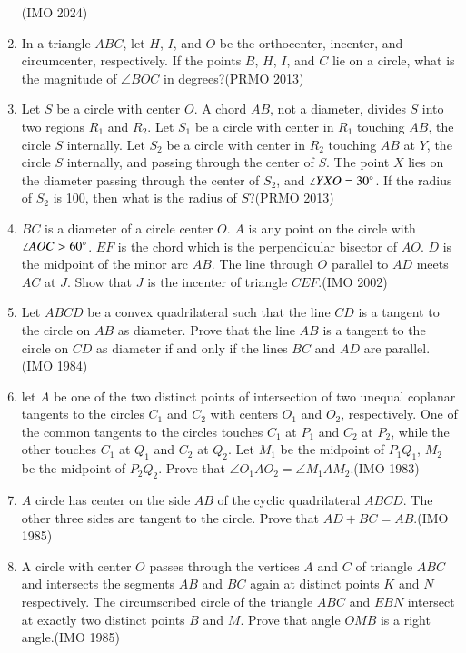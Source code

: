 \begin{enumerate}[label=\thesubsection.\arabic*,ref=\thesubsection.\theenumi]
\hfill(IMO 2024)
\item In a triangle $ ABC $, let $ H $, $ I $, and $ O $ be the orthocenter, incenter, and circumcenter, respectively. If the points $ B $, $ H $, $ I $, and $ C $ lie on a circle, what is the magnitude of $ \angle BOC $ in degrees?\hfill(PRMO 2013)
\item Let $ S $ be a circle with center $ O $. A chord $ AB $, not a diameter, divides $ S $ into two regions $ R_1 $ and $ R_2 $. Let $ S_1 $ be a circle with center in $ R_1 $ touching $ AB $, the circle $ S $ internally. Let $ S_2 $ be a circle with center in $ R_2 $ touching $ AB $ at $ Y $, the circle $ S $ internally, and passing through the center of $ S $. The point $ X $ lies on the diameter passing through the center of $ S_2 $, and $ \angle YXO = 30\degree $. If the radius of $ S_2 $ is 100, then what is the radius of $ S $?\hfill(PRMO 2013)
\item $BC$ is a diameter of a circle center $O$. $A$ is any point on the circle with $\angle AOC > 60\degree$. $EF$ is the chord which is the perpendicular bisector of $AO$. $D$ is the midpoint of the minor arc $AB$. The line through $O$ parallel to $AD$ meets $AC$ at $J$. Show that $J$ is the incenter of triangle $CEF$.\hfill(IMO 2002)
\item Let $ABCD$ be a convex quadrilateral such that the line $CD$ is a  tangent to the circle on $AB$ as diameter. Prove that the line $AB$ is a tangent to the  circle on $CD$ as diameter if and only if the lines $BC$ and $AD$ are parallel.\hfill(IMO 1984)
\item let $A$ be one of the two distinct points of intersection of two unequal coplanar tangents to the circles $C_1$ and $C_2$ with centers $ O_1$ and $O_2$, respectively. One of the common tangents to the circles touches $C_1$ at $P_1$ and $C_2$ at $P_2$, while the other touches $C_1$ at $Q_1$ and $C_2$ at $Q_2$.  Let $M_1$ be the midpoint of $P_1Q_1$, $M_2$ be the midpoint of $P_2Q_2$. Prove that $\angle O_1AO_2 =\angle M_1AM_2$.\hfill(IMO 1983)
     \item $A$ circle has center on the side $AB$ of the cyclic quadrilateral $ABCD$. The other three sides are tangent to the circle. Prove that $AD+BC = AB$.\hfill(IMO 1985)
\item A circle with center $O$ passes through the vertices $A$ and $C$ of triangle $ABC$ and intersects the segments $AB$ and $BC$ again at distinct points $K$ and $N$ respectively. The circumscribed circle of the triangle $ABC$ and $EBN$ intersect at exactly two distinct points $B$ and $M$. Prove that angle $OMB$ is a right angle.\hfill(IMO 1985)

\end{enumerate}

